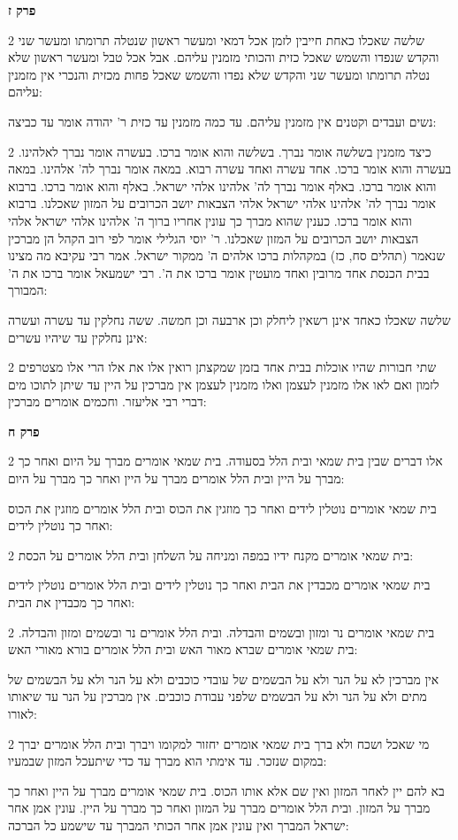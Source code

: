 \documentclass[12pt, openany]{book}
\newcommand{\sethebfont}{
\fontsize{10.5pt}{21.0pt} \selectfont
}
\newcommand{\twocol}[1]{
	{\sethebfont \begin{multicols}{2}
			#1
	\end{multicols}}	
}
\newcommand{\sectname}{}
\newcommand{\newsection}[1]{
	\addcontentsline{toc}{section}{#1}
	\renewcommand{\sectname}{#1}	
	\vspace{-\baselineskip}
	\begin{center}
		\textbf{%
\fontsize{16pt}{16pt}\selectfont
			#1}
	\end{center}
	\vspace{-\baselineskip}
	\nopagebreak
}
\begin{document}
\newsection{פרק ז}
\twocol{שלשה שאכלו כאחת חייבין לזמן אכל דמאי ומעשר ראשון שנטלה תרומתו ומעשר שני והקדש שנפדו והשמש שאכל כזית והכותי מזמנין עליהם. אבל אכל טבל ומעשר ראשון שלא נטלה תרומתו ומעשר שני והקדש שלא נפדו והשמש שאכל פחות מכזית והנכרי אין מזמנין עליהם: 
\par נשים ועבדים וקטנים אין מזמנין עליהם. עד כמה מזמנין עד כזית ר' יהודה אומר עד כביצה: }
\twocol{כיצד מזמנין בשלשה אומר נברך. בשלשה והוא אומר ברכו. בעשרה אומר נברך לאלהינו. בעשרה והוא אומר ברכו. אחד עשרה ואחד עשרה רבוא. במאה אומר נברך לה' אלהינו. במאה והוא אומר ברכו. באלף אומר נברך לה' אלהינו אלהי ישראל. באלף והוא אומר ברכו. ברבוא אומר נברך לה' אלהינו אלהי ישראל אלהי הצבאות יושב הכרובים על המזון שאכלנו. ברבוא והוא אומר ברכו. כענין שהוא מברך כך עונין אחריו ברוך ה' אלהינו אלהי ישראל אלהי הצבאות יושב הכרובים על המזון שאכלנו. ר' יוסי הגלילי אומר לפי רוב הקהל הן מברכין שנאמר (תהלים סח, כז) במקהלות ברכו אלהים ה' ממקור ישראל. אמר רבי עקיבא מה מצינו בבית הכנסת אחד מרובין ואחד מועטין אומר ברכו את ה'. רבי ישמעאל אומר ברכו את ה' המבורך: 
\par שלשה שאכלו כאחד אינן רשאין ליחלק וכן ארבעה וכן חמשה. ששה נחלקין עד עשרה ועשרה אינן נחלקין עד שיהיו עשרים: }
\twocol{שתי חבורות שהיו אוכלות בבית אחד בזמן שמקצתן רואין אלו את אלו הרי אלו מצטרפים לזמון ואם לאו אלו מזמנין לעצמן ואלו מזמנין לעצמן אין מברכין על היין עד שיתן לתוכו מים דברי רבי אליעזר. וחכמים אומרים מברכין: }
\newsection{פרק ח}
\twocol{אלו דברים שבין בית שמאי ובית הלל בסעודה. בית שמאי אומרים מברך על היום ואחר כך מברך על היין ובית הלל אומרים מברך על היין ואחר כך מברך על היום: 
\par בית שמאי אומרים נוטלין לידים ואחר כך מוזגין את הכוס ובית הלל אומרים מוזגין את הכוס ואחר כך נוטלין לידים: }
\twocol{בית שמאי אומרים מקנח ידיו במפה ומניחה על השלחן ובית הלל אומרים על הכסת: 
\par בית שמאי אומרים מכבדין את הבית ואחר כך נוטלין לידים ובית הלל אומרים נוטלין לידים ואחר כך מכבדין את הבית: }
\twocol{בית שמאי אומרים נר ומזון ובשמים והבדלה. ובית הלל אומרים נר ובשמים ומזון והבדלה. בית שמאי אומרים שברא מאור האש ובית הלל אומרים בורא מאורי האש: 
\par אין מברכין לא על הנר ולא על הבשמים של עובדי כוכבים ולא על הנר ולא על הבשמים של מתים ולא על הנר ולא על הבשמים שלפני עבודת כוכבים. אין מברכין על הנר עד שיאותו לאורו: }
\twocol{מי שאכל ושכח ולא ברך בית שמאי אומרים יחזור למקומו ויברך ובית הלל אומרים יברך במקום שנזכר. עד אימתי הוא מברך עד כדי שיתעכל המזון שבמעיו: 
\par בא להם יין לאחר המזון ואין שם אלא אותו הכוס. בית שמאי אומרים מברך על היין ואחר כך מברך על המזון. ובית הלל אומרים מברך על המזון ואחר כך מברך על היין. עונין אמן אחר ישראל המברך ואין עונין אמן אחר הכותי המברך עד שישמע כל הברכה: }
\end{document}
